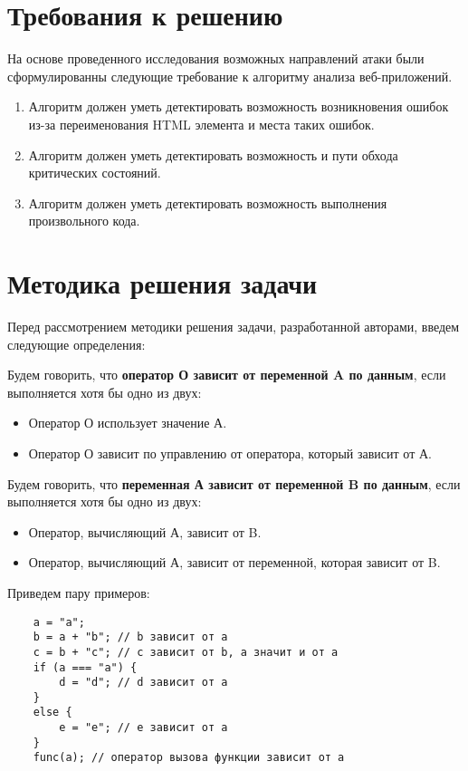\section{Требования к решению}
На основе проведенного исследования возможных направлений атаки были сформулированны следующие требование к алгоритму анализа веб-приложений.

\begin{enumerate}
	\item Алгоритм должен уметь детектировать возможность возникновения ошибок из-за переименования HTML элемента и места таких ошибок.
	\item Алгоритм должен уметь детектировать возможность и пути обхода критических состояний.
	\item Алгоритм должен уметь детектировать возможность выполнения произвольного кода.
\end{enumerate}

\section{Методика решения задачи}
Перед рассмотрением методики решения задачи, разработанной авторами, введем следующие определения:


Будем говорить, что \textbf{оператор О зависит от переменной A по данным}, если выполняется хотя бы одно из двух:
\begin{itemize}
	\item Оператор О использует значение А.
	\item Оператор О зависит по управлению от оператора, который зависит от А.
\end{itemize}


Будем говорить, что \textbf{переменная А зависит от переменной B по данным}, если выполняется хотя бы одно из двух:
\begin{itemize}
	\item Оператор, вычисляющий А, зависит от B.
	\item Оператор, вычисляющий А, зависит от переменной, которая зависит от B.
\end{itemize}

\bigskip
Приведем пару примеров:
\begin{lstlisting}
	a = "a";
	b = a + "b"; // b зависит от a
	c = b + "c"; // c зависит от b, а значит и от a
	if (a === "a") { 
		d = "d"; // d зависит от a
	}
	else {
		e = "e"; // e зависит от a
	}
	func(a); // оператор вызова функции зависит от a
\end{lstlisting}
\bigskip


